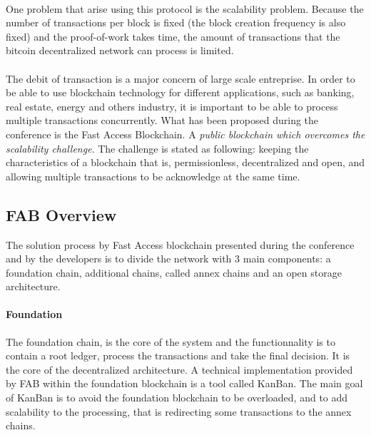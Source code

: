 \documentclass[11pt,a4paper]{article}
\begin{document}
\paragraph{}
One problem that arise using this protocol is the scalability problem.
Because the number of transactions per block is fixed
(the block creation frequency is also fixed)
and the
proof-of-work takes time, the amount of transactions
that the bitcoin decentralized network can process is limited.

\paragraph{}

The debit of transaction is a major concern of large scale
entreprise. In order to be able to use blockchain technology
for different applications, such as banking, real estate, energy
and others industry, it is important to be able
to process multiple transactions concurrently.
What has been proposed during the conference is the Fast Access Blockchain.
A \textit{public blockchain which overcomes the scalability challenge}.
The challenge is stated as following: keeping the characteristics
of a blockchain that is, permissionless, decentralized and open,
and allowing multiple transactions to be acknowledge at the same time.

\subsection{FAB Overview}

The solution process by Fast Access blockchain presented during
the conference and by the developers
\cite{fabmedium} is to divide the network with 3 main components:
a foundation chain, additional chains, called annex chains and an
open storage architecture.

\paragraph{Foundation}

The foundation chain, is the core of the system and the functionnality
is to contain a root ledger, process the transactions and take
the final decision. It is the core of the decentralized architecture.
A technical implementation provided by FAB within the foundation blockchain
is a tool called KanBan. The main goal of KanBan is to avoid the foundation
blockchain to be overloaded, and to add scalability to the
processing, that is redirecting some transactions to the
annex chains.
\end{document}
